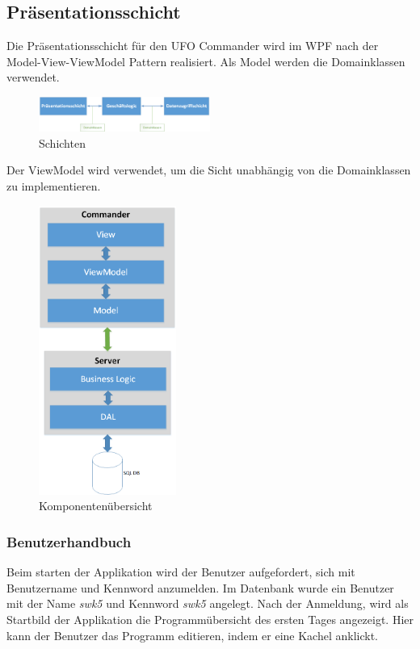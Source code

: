 \documentclass[12pt, a4paper]{article}
\begin{document}
\subsection{Präsentationsschicht}

Die Präsentationsschicht für den UFO Commander wird im WPF nach der Model-View-ViewModel Pattern realisiert. Als Model werden die Domainklassen verwendet.

\begin{figure}[h] 	
	\centering
		\includegraphics[width=0.5\textwidth]{Layers.png}
	\caption{Schichten}
\end{figure}

Der ViewModel wird verwendet, um die Sicht unabhängig von die Domainklassen zu implementieren.

\begin{figure}[h] 	
	\centering
		\includegraphics[width=0.4\textwidth]{Arhitecture.png}
	\caption{Komponentenübersicht}
\end{figure}

\subsubsection{Benutzerhandbuch}

Beim starten der Applikation wird der Benutzer aufgefordert, sich mit Benutzername und Kennword anzumelden. Im Datenbank wurde ein Benutzer mit der Name \textit{swk5} und Kennword \textit{swk5} angelegt. Nach der Anmeldung, wird als Startbild der Applikation die Programmübersicht des ersten Tages angezeigt. Hier kann der Benutzer das Programm editieren, indem er eine Kachel anklickt. 
\end{document}
